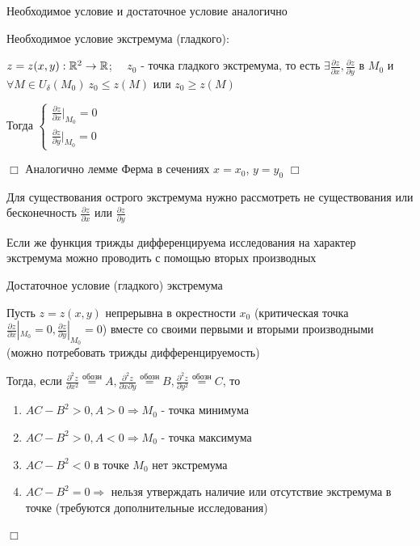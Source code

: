 \documentclass[12pt]{article}
\begin{document}
    Необходимое условие и достаточное условие аналогично

    \Th Необходимое условие экстремума (гладкого):

    $z = z(x, y) : \mathbb{R}^2 \rightarrow \mathbb{R}$; $\quad z_0$ - точка гладкого экстремума,
    то есть $\exists \frac{\partial z}{\partial x}, \frac{\partial z}{\partial y}$ в $M_0$ и $\forall M \in U_\delta(M_0) \ z_0 \leq z(M)$ или $z_0 \geq z(M)$

    Тогда $\begin{cases}\frac{\partial z}{\partial x} |_{M_0} = 0 \\ \frac{\partial z}{\partial y} |_{M_0} = 0\end{cases}$

    $\Box$ Аналогично лемме Ферма в сечениях $x = x_0$, $y = y_0$ $\Box$

    Для существования острого экстремума нужно рассмотреть не существования или бесконечность $\frac{\partial z}{\partial x}$ или $\frac{\partial z}{\partial y}$

    Если же функция трижды дифференцируема исследования на характер экстремума можно проводить с помощью вторых производных

    \Th Достаточное условие (гладкого) экстремума

    Пусть $z = z(x, y)$ непрерывна в окрестности $x_0$ (критическая точка $\frac{\partial z}{\partial x} |_{M_0} = 0, \frac{\partial z}{\partial y} |_{M_0} = 0$)
    вместе со своими первыми и вторыми производными (можно потребовать трижды дифференцируемость)

    Тогда, если $\frac{\partial^2 z}{\partial x^2} \stackrel{\text{обозн}}{=} A, \frac{\partial^2 z}{\partial x \partial y} \stackrel{\text{обозн}}{=} B, \frac{\partial^2 z}{\partial y^2} \stackrel{\text{обозн}}{=} C$, то

    \begin{enumerate}
        \item $AC - B^2 > 0, A > 0 \Longrightarrow M_0$ - точка минимума
        \item $AC - B^2 > 0, A < 0 \Longrightarrow M_0$ - точка максимума
        \item $AC - B^2 < 0$ в точке $M_0$ нет экстремума
        \item $AC - B^2 = 0\Longrightarrow$ нельзя утверждать наличие или отсутствие экстремума в точке (требуются дополнительные исследования)
    \end{enumerate}

    $\Box$
\end{document}
